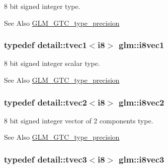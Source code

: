 8 bit signed integer type. 

\begin{DoxySeeAlso}{See Also}
\hyperlink{group__gtc__type__precision}{G\-L\-M\-\_\-\-G\-T\-C\-\_\-type\-\_\-precision} 
\end{DoxySeeAlso}
\hypertarget{group__gtc__type__precision_ga7d8b7cc439e81d9deef1477dcbe4bd0b}{
\subsubsection[{i8vec1}]{\setlength{\rightskip}{0pt plus 5cm}typedef detail\-::tvec1$<$i8$>$ {\bf glm\-::i8vec1}}}\label{group__gtc__type__precision_ga7d8b7cc439e81d9deef1477dcbe4bd0b}


8 bit signed integer scalar type. 

\begin{DoxySeeAlso}{See Also}
\hyperlink{group__gtc__type__precision}{G\-L\-M\-\_\-\-G\-T\-C\-\_\-type\-\_\-precision} 
\end{DoxySeeAlso}
\hypertarget{group__gtc__type__precision_ga4d5ac02b48c4c6e1642ae89f9d3f3c7e}{
\subsubsection[{i8vec2}]{\setlength{\rightskip}{0pt plus 5cm}typedef detail\-::tvec2$<$i8$>$ {\bf glm\-::i8vec2}}}\label{group__gtc__type__precision_ga4d5ac02b48c4c6e1642ae89f9d3f3c7e}


8 bit signed integer vector of 2 components type. 

\begin{DoxySeeAlso}{See Also}
\hyperlink{group__gtc__type__precision}{G\-L\-M\-\_\-\-G\-T\-C\-\_\-type\-\_\-precision} 
\end{DoxySeeAlso}
\hypertarget{group__gtc__type__precision_gafd1d80c392c472fc14864ebd8c9316e9}{
\subsubsection[{i8vec3}]{\setlength{\rightskip}{0pt plus 5cm}typedef detail\-::tvec3$<$i8$>$ {\bf glm\-::i8vec3}}}\label{group__gtc__type__precision_gafd1d80c392c472fc14864ebd8c9316e9}


